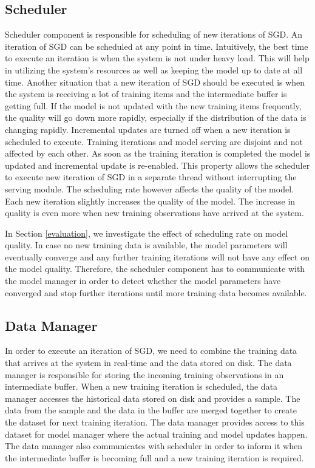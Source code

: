 \documentclass{vldb}
\begin{document}
\subsection{Scheduler}\label{scheduler}
Scheduler component is responsible for scheduling of new iterations of SGD.
An iteration of SGD can be scheduled at any point in time.
Intuitively, the best time to execute an iteration is when the system is not under heavy load.
This will help in utilizing the system's resources as well as keeping the model up to date at all time.
Another situation that a new iteration of SGD should be executed is when the system is receiving a lot of training items and the intermediate buffer is getting full.
If the model is not updated with the new training items frequently, the quality will go down more rapidly, especially if the distribution of the data is changing rapidly.
Incremental updates are turned off when a new iteration is scheduled to execute.
Training iterations and model serving are disjoint and not affected by each other.
As soon as the training iteration is completed the model is updated and incremental update is re-enabled.
This property allows the scheduler to execute new iteration of SGD in a separate thread without interrupting the serving module.
The scheduling rate however affects the quality of the model.
Each new iteration slightly increases the quality of the model.
The increase in quality is even more when new training observations have arrived at the system.

In Section \ref{evaluation}, we investigate the effect of scheduling rate on model quality.
In case no new training data is available, the model parameters will eventually converge and any further training iterations will not have any effect on the model quality.
Therefore, the scheduler component has to communicate with the model manager in order to detect whether the model parameters have converged and stop further iterations until more training data becomes available.

\subsection{Data Manager} \label{data-manager}
In order to execute an iteration of SGD, we need to combine the training data that arrives at the system in real-time and the data stored on disk.
The data manager is responsible for storing the incoming training observations in an intermediate buffer.
When a new training iteration is scheduled, the data manager accesses the historical data stored on disk and provides a sample.
The data from the sample and the data in the buffer are merged together to create the dataset for next training iteration.
The data manager provides access to this dataset for model manager where the actual training and model updates happen.
The data manager also communicates with scheduler in order to inform it when the intermediate buffer is becoming full and a new training iteration is required. 
\end{document}
